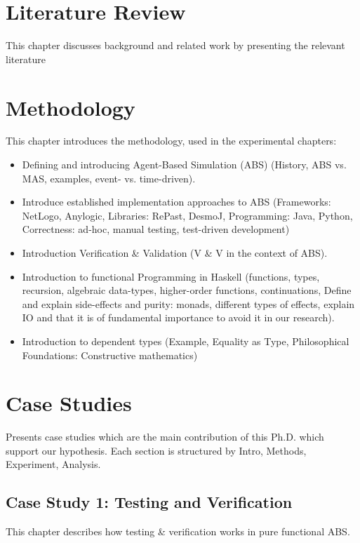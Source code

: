 \section{Literature Review}
This chapter discusses background and related work by presenting the relevant literature 

\section{Methodology}
This chapter introduces the methodology, used in the experimental chapters:

\begin{itemize}
	\item Defining and introducing Agent-Based Simulation (ABS) (History, ABS vs. MAS, examples, event- vs. time-driven).
	\item Introduce established implementation approaches to ABS (Frameworks: NetLogo, Anylogic, Libraries: RePast, DesmoJ, Programming: Java, Python, Correctness: ad-hoc, manual testing, test-driven development)
	\item Introduction Verification \& Validation (V \& V in the context of ABS).
	\item Introduction to functional Programming in Haskell (functions, types, recursion, algebraic data-types, higher-order functions, continuations, Define and explain side-effects and purity: monads, different types of effects, explain IO and that it is of fundamental importance to avoid it in our research).
	\item Introduction to dependent types (Example, Equality as Type, Philosophical Foundations: Constructive mathematics)
\end{itemize}

\section{Case Studies}
Presents case studies which are the main contribution of this Ph.D. which support our hypothesis. Each section is structured by Intro, Methods, Experiment, Analysis.

\subsection{Case Study 1: Testing and Verification}
This chapter describes how testing \& verification works in pure functional ABS.

